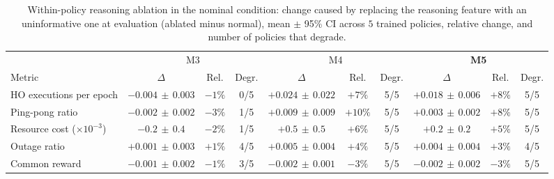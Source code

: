 \documentclass[journal]{IEEEtran}
\begin{document}
\begin{table}[t]
\centering
\caption{Within-policy reasoning ablation in the nominal condition: change caused by replacing the reasoning feature with an uninformative one at evaluation (ablated minus normal), mean $\pm$ 95\% CI across $5$ trained policies, relative change, and number of policies that degrade.}
\label{tab:reasoning}
\footnotesize
\setlength{\tabcolsep}{3.5pt}
\begin{tabular}{@{}lccccccccc@{}}
\toprule
 & \multicolumn{3}{c}{M3} & \multicolumn{3}{c}{M4} & \multicolumn{3}{c}{\textbf{M5}}\\
\cmidrule(lr){2-4}\cmidrule(lr){5-7}\cmidrule(l){8-10}
Metric & $\Delta$ & Rel. & Degr. & $\Delta$ & Rel. & Degr. & $\Delta$ & Rel. & Degr.\\
\midrule
HO executions per epoch & $-0.004\,{\pm}\,0.003$ & $-1\%$ & 0/5 & $+0.024\,{\pm}\,0.022$ & $+7\%$ & 5/5 & $+0.018\,{\pm}\,0.006$ & $+8\%$ & 5/5\\
Ping-pong ratio & $-0.002\,{\pm}\,0.002$ & $-3\%$ & 1/5 & $+0.009\,{\pm}\,0.009$ & $+10\%$ & 5/5 & $+0.003\,{\pm}\,0.002$ & $+8\%$ & 5/5\\
Resource cost ($\times10^{-3}$) & $-0.2\,{\pm}\,0.4$ & $-2\%$ & 1/5 & $+0.5\,{\pm}\,0.5$ & $+6\%$ & 5/5 & $+0.2\,{\pm}\,0.2$ & $+5\%$ & 5/5\\
Outage ratio & $+0.001\,{\pm}\,0.003$ & $+1\%$ & 4/5 & $+0.005\,{\pm}\,0.004$ & $+4\%$ & 5/5 & $+0.004\,{\pm}\,0.004$ & $+3\%$ & 4/5\\
Common reward & $-0.001\,{\pm}\,0.002$ & $-1\%$ & 3/5 & $-0.002\,{\pm}\,0.001$ & $-3\%$ & 5/5 & $-0.002\,{\pm}\,0.002$ & $-3\%$ & 5/5\\
\bottomrule
\end{tabular}
\end{table}
\end{document}
